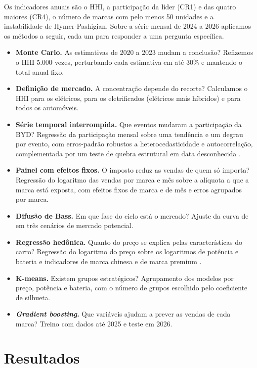 \documentclass[article,11pt,oneside,a4paper,english,brazil,sumario=tradicional]{abntex2}
\begin{document}
Os indicadores anuais são o HHI, a participação da líder (CR1) e das quatro maiores (CR4), o número de marcas com pelo menos 50 unidades e a instabilidade de Hymer-Pashigian. Sobre a série mensal de 2024 a 2026 aplicamos os métodos a seguir, cada um para responder a uma pergunta específica.

\begin{itemize}
\item \textbf{Monte Carlo.} As estimativas de 2020 a 2023 mudam a conclusão? Refizemos o HHI 5.000 vezes, perturbando cada estimativa em até 30\% e mantendo o total anual fixo.
\item \textbf{Definição de mercado.} A concentração depende do recorte? Calculamos o HHI para os elétricos, para os eletrificados (elétricos mais híbridos) e para todos os automóveis.
\item \textbf{Série temporal interrompida.} Que eventos mudaram a participação da BYD? Regressão da participação mensal sobre uma tendência e um degrau por evento, com erros-padrão robustos a heterocedasticidade e autocorrelação, complementada por um teste de quebra estrutural em data desconhecida \cite{andrews1993}.
\item \textbf{Painel com efeitos fixos.} O imposto reduz as vendas de quem só importa? Regressão do logaritmo das vendas por marca e mês sobre a alíquota a que a marca está exposta, com efeitos fixos de marca e de mês e erros agrupados por marca.
\item \textbf{Difusão de Bass.} Em que fase do ciclo está o mercado? Ajuste da curva de  em três cenários de mercado potencial.
\item \textbf{Regressão hedônica.} Quanto do preço se explica pelas características do carro? Regressão do logaritmo do preço sobre os logaritmos de potência e bateria e indicadores de marca chinesa e de marca premium \cite{rosen1974}.
\item \textbf{K-means.} Existem grupos estratégicos? Agrupamento dos modelos por preço, potência e bateria, com o número de grupos escolhido pelo coeficiente de silhueta.
\item \textbf{\textit{Gradient boosting}.} Que variáveis ajudam a prever as vendas de cada marca? Treino com dados até 2025 e teste em 2026.
\end{itemize}

\section{Resultados}\label{sec:resultados}
\end{document}
